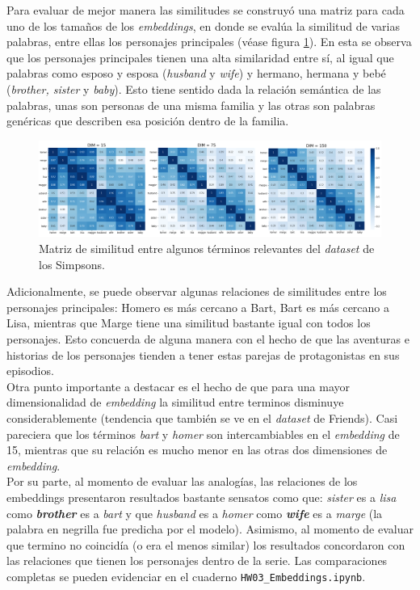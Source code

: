 Para evaluar de mejor manera las similitudes se construyó una matriz para cada uno de los tamaños de los \textit{embeddings}, en donde se evalúa la similitud de varias palabras, entre ellas los personajes principales (véase figura \ref{fig:simpsons_sim_matrix}). En esta se observa que los personajes principales tienen una alta similaridad entre sí, al igual que palabras como esposo y esposa (\textit{husband} y \textit{wife}) y hermano, hermana y bebé (\textit{brother, sister} y \textit{baby}). Esto tiene sentido dada la relación semántica de las palabras, unas son personas de una misma familia y las otras son palabras genéricas que describen esa posición dentro de la familia. 

\begin{figure}[H]
    \centering
    \includegraphics[width=\textwidth]{doc/images/simpsons_sim_matrix.png}
    \caption{Matriz de similitud entre algunos términos relevantes del \textit{dataset} de los Simpsons.}
    \label{fig:simpsons_sim_matrix}
\end{figure}

Adicionalmente, se puede observar algunas relaciones de similitudes entre los personajes principales: Homero es más cercano a Bart, Bart es más cercano a Lisa, mientras que Marge tiene una similitud bastante igual con todos los personajes. Esto concuerda de alguna manera con el hecho de que las aventuras e historias de los personajes tienden a tener estas parejas de protagonistas en sus episodios.  \\

Otra punto importante a destacar es el hecho de que para una mayor dimensionalidad de \textit{embedding} la similitud entre terminos disminuye considerablemente (tendencia que también se ve en el \textit{dataset} de Friends). Casi pareciera que los términos \textit{bart} y \textit{homer} son intercambiables en el \textit{embedding} de 15, mientras que su relación es mucho menor en las otras dos dimensiones de \textit{embedding}. \\

Por su parte, al momento de evaluar las analogías, las relaciones de los embeddings presentaron resultados bastante sensatos como que: \textit{sister} es a \textit{lisa} como \textit{\textbf{brother}} es a \textit{bart} y que \textit{husband} es a \textit{homer} como \textit{\textbf{wife}} es a \textit{marge} (la palabra en negrilla fue predicha por el modelo). Asimismo, al momento de evaluar que termino no coincidía (o era el menos similar) los resultados concordaron con las relaciones que tienen los personajes dentro de la serie. Las comparaciones completas se pueden evidenciar en el cuaderno \texttt{HW03\_Embeddings.ipynb}.

